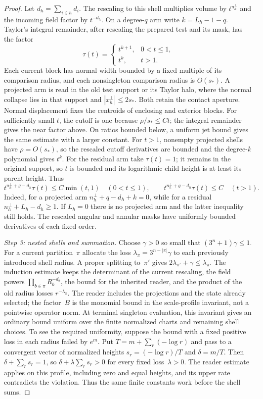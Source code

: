 \begin{proof}
Let $d_h=\sum_{i\in h}d_i$. The rescaling to this shell multiplies volume by $t^{n_h^\perp}$ and the incoming field factor by $t^{-d_h}$. On a degree-$q$ arm write $k=L_h-1-q$. Taylor's integral remainder, after rescaling the prepared test and its mask, has the factor
\[
 \tau(t)=\begin{cases}t^{k+1},&0<t\le1,\\ t^k,&t>1.\end{cases}
\]
Each current block has normal width bounded by a fixed multiple of its comparison radius, and each nonsingleton comparison radius is $O(s_*)$. A projected arm is read in the old test support or its Taylor halo, where the normal collapse lies in that support and $|x_h^\perp|\le2s_*$. Both retain the contact aperture. Normal displacement fixes the centroids of enclosing and exterior blocks. For sufficiently small $t$, the cutoff is one because $\rho/s_*\le Ct$; the integral remainder gives the near factor above. On ratios bounded below, a uniform jet bound gives the same estimate with a larger constant. For $t>1$, nonempty projected shells have $\rho=O(s_*)$, so the rescaled cutoff derivatives are bounded and the degree-$k$ polynomial gives $t^k$. For the residual arm take $\tau(t)=1$; it remains in the original support, so $t$ is bounded and its logarithmic child height is at least its parent height. Thus
\begin{equation}\label{eq:J-shell-gain}
 t^{n_h^\perp+g-d_h}\tau(t)\le C\min(t,1)
 \quad(0<t\le1),\qquad
 t^{n_h^\perp+g-d_h}\tau(t)\le C\quad(t>1).
\end{equation}
Indeed, for a projected arm $n_h^\perp+q-d_h+k=0$, while for a residual $n_h^\perp+L_h-d_h\ge1$. If $L_h=0$ there is no projected arm and the latter inequality still holds. The rescaled angular and annular masks have uniformly bounded derivatives of each fixed order.

\emph{Step 3: nested shells and summation.} Choose $\gamma>0$ so small that $(3^n+1)\gamma\le1$. For a current partition~$\pi$ allocate the loss $\lambda_\pi=3^{n-|\pi|}\gamma$ to each previously introduced shell radius. A proper splitting to~$\pi'$ gives $2\lambda_{\pi'}+\gamma\le\lambda_\pi$. The induction estimate keeps the determinant of the current rescaling, the field powers $\prod_{b\in\pi}R_b^{-d_b}$, the bound for the inherited reader, and the product of the old radius losses $r^{-\lambda_\pi}$. The reader includes the projections and the state already selected; the factor~$B$ is the monomial bound in the scale-profile invariant, not a pointwise operator norm. At terminal singleton evaluation, this invariant gives an ordinary bound uniform over the finite normalized charts and remaining shell choices. To see the required uniformity, suppose the bound with a fixed positive loss in each radius failed by $e^m$. Put $T=m+\sum_r(-\log r)$ and pass to a convergent vector of normalized heights $s_r=(-\log r)/T$ and $\delta=m/T$. Then $\delta+\sum_rs_r=1$, so $\delta+\lambda\sum_rs_r>0$ for every fixed loss~$\lambda>0$. The reader estimate applies on this profile, including zero and equal heights, and its upper rate contradicts the violation. Thus the same finite constants work before the shell sums.


\end{proof}
